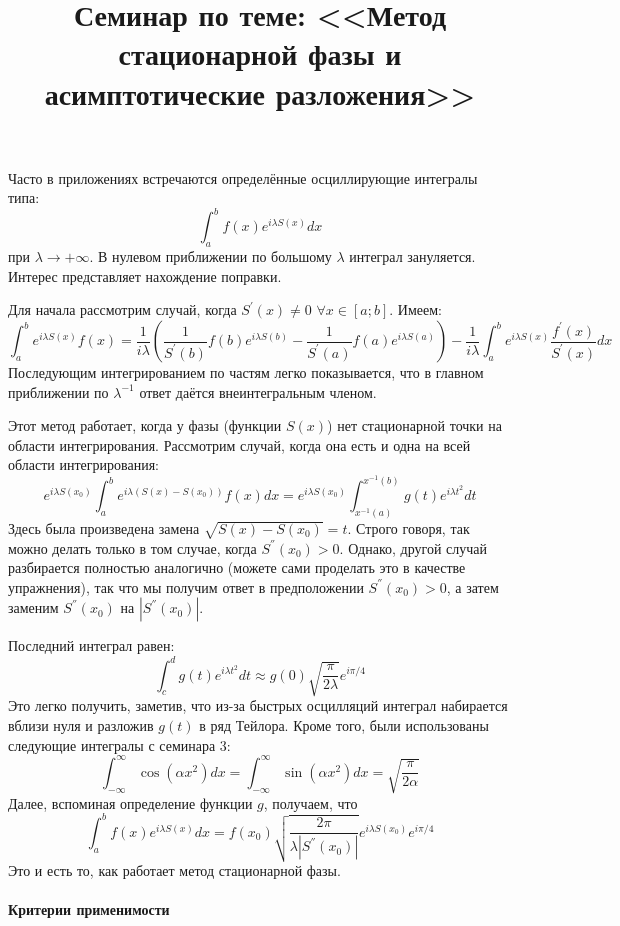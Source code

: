 \documentclass[a4paper,12pt]{article}
\begin{document}
\title{Семинар по теме: <<Метод стационарной фазы и асимптотические разложения>>}
\maketitle

\noindent
Часто в приложениях встречаются определённые осциллирующие интегралы
типа: 
\[
\int_{a}^{b}f(x)e^{i\lambda S(x)}dx
\]
при $\lambda\to+\infty$. В нулевом приближении по большому $\lambda$ интеграл зануляется. Интерес представляет нахождение поправки.  

\noindent
Для начала рассмотрим случай, когда $S^{'}(x)\ne0$ $\forall x\in [a;b]$. Имеем:
$$
\int_{a}^{b}e^{i\lambda S(x)}f(x)=\frac{1}{i\lambda}\left(\frac{1}{S^{'}(b)}f(b)e^{i\lambda S(b)}-\frac{1}{S^{'}(a)}f(a)e^{i\lambda S(a)}\right)-\frac{1}{i\lambda}\int_{a}^{b}e^{i\lambda S(x)}\frac{f^{'}(x)}{S^{'}(x)}dx
$$
Последующим интегрированием по частям легко показывается, что в главном приближении по $\lambda^{-1}$ ответ даётся внеинтегральным членом.

\noindent
Этот метод работает, когда у фазы (функции $S(x)$) нет стационарной точки на области интегрирования. Рассмотрим случай, когда она есть и одна на всей области интегрирования:
$$
e^{i\lambda S(x_0)}\int_{a}^{b}e^{i\lambda( S(x)-S(x_0))}f(x)dx=e^{i\lambda S(x_0)}\int_{x^{-1}(a)}^{x^{-1}(b)}g(t)e^{i\lambda t^2}dt
$$
Здесь была произведена замена $\sqrt{S(x)-S(x_0)}=t$. Строго говоря, так можно делать только в том случае, когда $S^{''}(x_0)>0$. Однако, другой случай разбирается полностью аналогично (можете сами проделать это в качестве упражнения), так что мы получим ответ в предположении $S^{''}(x_0)>0$, а затем заменим $S^{''}(x_0)$ на $|S^{''}(x_0)|$. 

\noindent
Последний интеграл равен:
$$
\int_{c}^{d}g(t)e^{i\lambda t^2}dt\approx g(0)\sqrt{\frac{\pi}{2\lambda}}e^{i\pi/4}
$$
Это легко получить, заметив, что из-за быстрых осцилляций интеграл набирается вблизи нуля и разложив $g(t)$ в ряд Тейлора. Кроме того, были использованы следующие интегралы с семинара 3:
\[
\int_{-\infty}^{\infty}\cos(\alpha x^{2})dx=\int_{-\infty}^{\infty}\sin(\alpha x^{2})dx=\sqrt{\frac{\pi}{2\alpha}}
\]
Далее, вспоминая определение функции $g$, получаем, что 
$$
\int_{a}^{b}f(x)e^{i\lambda S(x)}dx=f(x_0)\sqrt{\frac{2\pi}{\lambda |S^{''}(x_0)|}}e^{i\lambda S(x_0)}e^{i\pi/4}
$$
Это и есть то, как работает метод стационарной фазы.


\paragraph{Критерии применимости}
\end{document}
